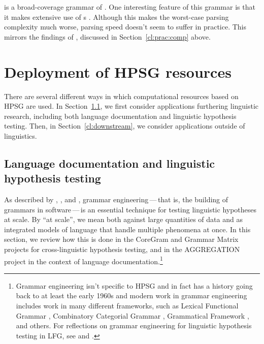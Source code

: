 \documentclass[output=paper
                ,modfonts
                ,nonflat
	        ,collection
	        ,collectionchapter
	        ,collectiontoclongg
 	        ,biblatex
                ,babelshorthands
                ,newtxmath
                ,draftmode
                ,colorlinks, citecolor=brown
]{./langsci/langscibook}
\begin{document}
 is a broad-coverage grammar of  \citep{Babel,Mueller99a}.
One interesting feature of this grammar is that
it makes extensive use of s \citep{Mueller2004b}.
Although this makes the worst-case parsing complexity much worse,
parsing speed doesn't seem to suffer in practice.
This mirrors the findings of \citet{Carroll94},
discussed in Section~\ref{cl:prac:comp} above.






\section{Deployment of HPSG resources}
\label{cl:deployment}

There are several different ways in which computational resources
based on HPSG are used.
In Section~\ref{cl:lang-doc}, we first consider applications furthering linguistic research,
including both language documentation and linguistic hypothesis testing.
Then, in Section~\ref{cl:downstream}, we consider applications outside of linguistics.


\subsection{Language documentation and linguistic hypothesis testing}
\label{cl:lang-doc}


As described by \citet{Mueller99a}, \citet{Bender2008c}, and \citet{BFO2011a-u},
grammar engineering\,---\,that is, the building of grammars in software\,---\,is
an essential technique for testing linguistic hypotheses at scale. By
``at scale'', we mean both against large quantities of data and as
integrated models of language that handle multiple phenomena at
once. In this section, we review how this is done in the CoreGram
and Grammar Matrix projects for cross-linguistic hypothesis testing,
and in the AGGREGATION project in the context of language
documentation.\footnote{Grammar engineering isn't specific to HPSG and
in fact has a history going back to at least the early 1960s \citep{Kay:63,ZFHW65a,Petrick65a-u,FBDPM71a-u}
and modern work in grammar engineering includes work in many different frameworks, such as Lexical Functional Grammar \citep{BKNS99a-ed}, Combinatory Categorial
Grammar \citep{BCPW2007a}, Grammatical Framework \citep{Ranta:09}, and others.
For reflections on grammar engineering for linguistic hypothesis testing
in LFG, see \citet{BKNS99a-ed} and \citet{King:16}.}
\end{document}
